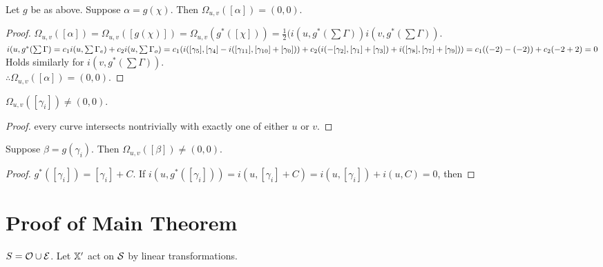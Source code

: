 \documentclass[]{article}
\begin{document}
\begin{thm}
Let $g$ be as above. Suppose $\alpha=g(\chi)$. Then $\Omega_{u,v}([\alpha])=(0,0)$. 
\begin{proof}
$\Omega_{u,v}([\alpha])=\Omega_{u,v}([g(\chi)])=\Omega_{u,v}(g^{*}([\chi]))=\frac{1}{2}(i(u,g^*(\sum\Gamma)) i(v,g^*(\sum\Gamma))$.\\
$i(u,g^*(\sum\Gamma)=c_1 i(u,\sum
\Gamma_e)+c_2 i(u,\sum\Gamma_o)=\\ c_1(i([\gamma_5],[\gamma_{4}] - i([\gamma_{11}],[\gamma_{10}]+[\gamma_{0}]))\\+c_2(i(-[\gamma_2],[\gamma_{1}]+[\gamma_{3}]) + i([\gamma_8],[\gamma_{7}]+[\gamma_{9}]) )=\\c_1((-2)-(-2))+c_2(-2+ 2 )=0\\$
Holds similarly for $i(v,g^*(\sum\Gamma)).$\\
$\therefore \Omega_{u,v}([\alpha])=(0,0)$.
\end{proof}
\end{thm}

\begin{lem}
$\Omega_{u,v}([\gamma_i])\neq (0,0)$.
\begin{proof}
every curve intersects nontrivially with exactly one of either $u$ or $v$.
\end{proof}
\end{lem}

\begin{thm}
Suppose $\beta=g(\gamma_i)$. Then $\Omega_{u,v}([\beta])\neq (0,0)$.
\begin{proof}
$g^*([\gamma_i])=[\gamma_i]+C$.
If $i(u,g^*([\gamma_i]))=i(u,[\gamma_i]+C)=i(u,[\gamma_i])+i(u,C)=0$, then 
\end{proof}
\end{thm}


\section{Proof of Main Theorem}

$S=\mathcal{O}\cup \mathcal{E}$.
Let $\mathbb{X}'$ act on $\mathcal{S}$ by linear transformations.

\begin{lem}

\end{lem}
\end{document}
